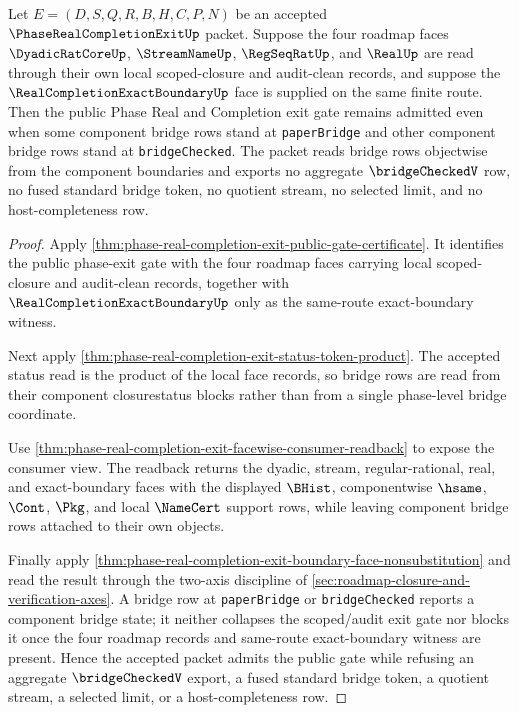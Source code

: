 \begin{theorem}
\label{thm:phase-real-completion-exit-bridge-pending-axis-separation}
Let $E=(D,S,Q,R,B,H,C,P,N)$ be an accepted $\PhaseRealCompletionExitUp$ packet. Suppose the four roadmap faces $\DyadicRatCoreUp$, $\StreamNameUp$, $\RegSeqRatUp$, and $\RealUp$ are read through their own local scoped-closure and audit-clean records, and suppose the $\RealCompletionExactBoundaryUp$ face is supplied on the same finite route. Then the public Phase Real and Completion exit gate remains admitted even when some component bridge rows stand at \texttt{paperBridge} and other component bridge rows stand at \texttt{bridgeChecked}. The packet reads bridge rows objectwise from the component boundaries and exports no aggregate $\bridgeCheckedV$ row, no fused standard bridge token, no quotient stream, no selected limit, and no host-completeness row.
\end{theorem}
\begin{proof}
Apply \autoref{thm:phase-real-completion-exit-public-gate-certificate}. It identifies the public phase-exit gate with the four roadmap faces carrying local scoped-closure and audit-clean records, together with $\RealCompletionExactBoundaryUp$ only as the same-route exact-boundary witness.

Next apply \autoref{thm:phase-real-completion-exit-status-token-product}. The accepted status read is the product of the local face records, so bridge rows are read from their component closurestatus blocks rather than from a single phase-level bridge coordinate.

Use \autoref{thm:phase-real-completion-exit-facewise-consumer-readback} to expose the consumer view. The readback returns the dyadic, stream, regular-rational, real, and exact-boundary faces with the displayed $\BHist$, componentwise $\hsame$, $\Cont$, $\Pkg$, and local $\NameCert$ support rows, while leaving component bridge rows attached to their own objects.

Finally apply \autoref{thm:phase-real-completion-exit-boundary-face-nonsubstitution} and read the result through the two-axis discipline of \autoref{sec:roadmap-closure-and-verification-axes}. A bridge row at \texttt{paperBridge} or \texttt{bridgeChecked} reports a component bridge state; it neither collapses the scoped/audit exit gate nor blocks it once the four roadmap records and same-route exact-boundary witness are present. Hence the accepted packet admits the public gate while refusing an aggregate $\bridgeCheckedV$ export, a fused standard bridge token, a quotient stream, a selected limit, or a host-completeness row.
\end{proof}

